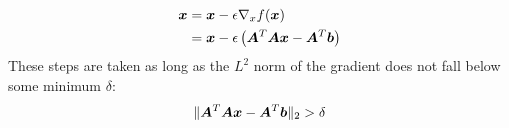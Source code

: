 \begin{multicols}{2}
	\begin{align*}
	\bol{x} &= \bol{x}-\epsilon \nabla_x f(\bol{x})\\
	&= \bol{x} -\epsilon \left(\bol{A}^T\bolA\bol{x}-\bolA^T\bol{b}\right)
	\end{align*}
	These steps are taken as long as the $L^2$ norm of the gradient does not fall below some minimum $\delta$:
	\[ \lVert \bolA^T\bol{Ax}-\bolA^T\bol{b}\rVert_2 > \delta \]
	
	
\end{multicols}
\newpage






























